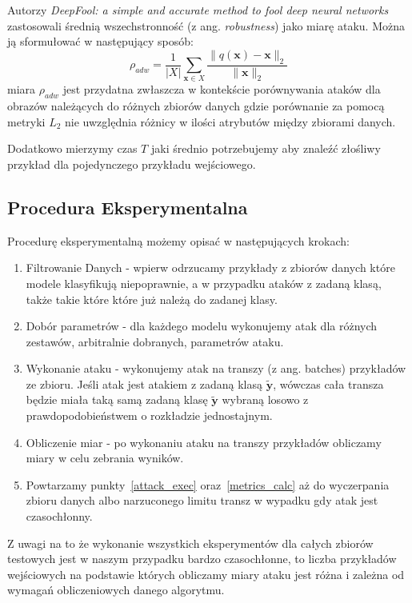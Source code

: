 \documentclass[
    left=2.5cm,         %
    right=2.5cm,        %
    top=2.5cm,          %
    bottom=3cm,         %
    bindingoffset=6mm,  %
    nohyphenation=false %
]{eiti/eiti-thesis}
\renewcommand{\vec}[1]{\mathbf{#1}}
\begin{document}
    Autorzy \textit{DeepFool: a simple and accurate method to fool deep neural networks}\cite{DBLP:journals/corr/Moosavi-Dezfooli15}
    zastosowali średnią wszechstronność (z ang. \textit{robustness}) jako miarę ataku. Można ją sformułować w następujący sposób:
    \begin{equation}
        \rho_{adw}=\frac{1}{|X|}\sum_{\vec{x} \in X} \frac{\|q(\vec{x}) - \vec{x}\|_2}{\|\vec{x}\|_2}
    \end{equation}
    miara \(\rho_{adw}\) jest przydatna zwłaszcza w kontekście porównywania ataków dla obrazów należących do
    różnych zbiorów danych gdzie porównanie za pomocą metryki \(L_2\) nie uwzględnia różnicy w ilości atrybutów między zbiorami
    danych.

    Dodatkowo mierzymy czas $T$ jaki średnio potrzebujemy aby znaleźć złośliwy przykład dla pojedynczego przykładu wejściowego.

\subsection{Procedura Eksperymentalna}
Procedurę eksperymentalną możemy opisać w następujących krokach:
\begin{enumerate}
    \item Filtrowanie Danych - wpierw odrzucamy przykłady z zbiorów danych które modele klasyfikują niepoprawnie, a w
    przypadku ataków z zadaną klasą, także takie które które już należą do zadanej klasy.
    \item Dobór parametrów  - dla każdego modelu wykonujemy atak dla różnych zestawów, arbitralnie dobranych, parametrów ataku.
    \item Wykonanie ataku \label{attack_exec} - wykonujemy atak na transzy (z ang. batches) przykładów ze zbioru. Jeśli atak jest atakiem z zadaną klasą $\vec{\widetilde{y}}$, wówczas
    cała transza będzie miała taką samą zadaną klasę $\vec{\widetilde{y}}$ wybraną losowo z prawdopodobieństwem o rozkładzie jednostajnym.
    \item Obliczenie miar \label{metrics_calc} - po wykonaniu ataku na transzy przykładów obliczamy miary w celu zebrania wyników.
    \item Powtarzamy punkty~\ref{attack_exec} oraz~\ref{metrics_calc} aż do wyczerpania zbioru danych albo narzuconego limitu transz w wypadku gdy atak jest czasochłonny.
\end{enumerate}
Z uwagi na to że wykonanie wszystkich eksperymentów dla całych zbiorów testowych jest w naszym przypadku bardzo czasochłonne,
to liczba przykładów wejściowych na podstawie których obliczamy miary ataku jest różna i zależna od wymagań obliczeniowych
danego algorytmu.
\end{document}
